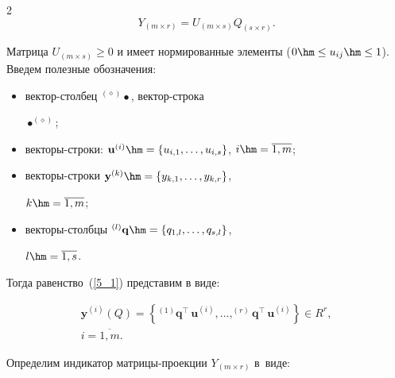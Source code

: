 \begin{multicols}{2}
\begin{equation}
\label{5_1}


Y_{(m \times r)} = U_{(m \times s)} Q_{(s \times r)}.


\end{equation}


Матрица $U_{(m \times s)} \ge 0$ и имеет нормированные элементы ($0\hm \le 


u_{ij} \hm\le 1$). Введем полезные обозначения:


\begin{itemize}


\item вектор-столбец $^{(\diamond)}\bullet$, век\-тор-стро\-ка 


$\bullet^{(\diamond)}$;


\item векторы-строки: $\mathbf{u}^{(i)} \hm= \{u_{i,1}, \dots, u_{i,s}\}$, $i 


\hm= \overline{1,m}$;


\item векторы-строки  $\mathbf{y}^{(k)} \hm= \{y_{k,1}, \dots, y_{k,r}\}$, 


$k\hm = \overline{1,m}$;


\item векторы-столбцы  $^{(l)}\mathbf{q}\hm = \{q_{1,l}, \dots, q_{s,l}\}$, 


$l\hm = \overline{1,s}$.


\end{itemize}


Тогда равенство~(\ref{5_1}) представим в виде:










\noindent


\begin{multline*}




\mathbf{y}^{(i)}(Q) = \left\{^{(1)}\mathbf{q}^\intercal\,\mathbf{u}^{(i)}, 


\dots, ^{(r)}\mathbf{q}^\intercal\,\mathbf{u}^{(i)}\right\} \in R^r,\\


 i =  \overline{1,m}.


\end{multline*}


Определим индикатор матрицы-проекции $Y_{(m \times r)}$ в~виде:


\begin{equation}



\end{equation}
\end{multicols}
